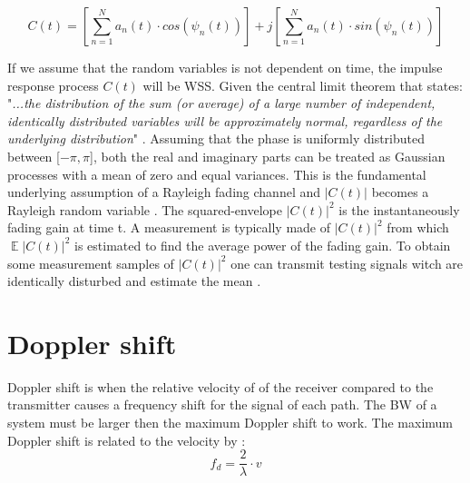 \begin{equation}\label{eq:inf_reyl_impulse_response}
C(t) = \left [ \sum_{n =1}^{N} a_n(t)\cdot cos(\psi_n (t))\right ] + j\left [\sum_{n =1}^{N} a_n(t)\cdot sin(\psi_n (t))  \right ]
\end{equation}
\begin{where}
\end{where}

If we assume that the random variables is not dependent on time, the impulse response process $C(t)$ will be \gls{WSS}. Given the central limit theorem that states:
"\textit{...the distribution of the sum (or average) of a large number of independent, identically distributed variables will be approximately normal, regardless of the underlying distribution}" \citep{CentralLimit}.  
Assuming that the phase is uniformly distributed between [$-\pi,\pi$], both the real and imaginary parts can be treated as Gaussian processes with a mean of zero and equal variances. This is the fundamental underlying assumption of a Rayleigh fading channel and $ \left | C(t) \right | $ becomes a Rayleigh random variable \citep[p. 589]{Wireless_CommunicationsBook}. The squared-envelope $ \left | C(t) \right |^2 $ is the instantaneously fading gain at time t. A measurement is typically made of $ \left | C(t) \right |^2 $ from which $ \mathop{\mathbb{E}}\left | C(t) \right |^2 $ is estimated to find the average power of the fading gain. To obtain some measurement samples of $ \left | C(t) \right |^2 $ one can transmit testing signals witch are identically disturbed and estimate the mean \citep{MeasurementComplexRay}.




\section{Doppler shift}
Doppler shift is when the relative velocity of of the receiver compared to the transmitter causes a frequency shift for the signal of each path. The \gls{BW} of a system must be larger then the maximum Doppler shift to work. The maximum Doppler shift is related to the velocity by \citep[p. 229]{Wireless_CommunicationsBook}:
\begin{equation}\label{eq:Doppler}
f_d = \frac{2}{\lambda} \cdot v
\end{equation}
\begin{where}
\end{where}

